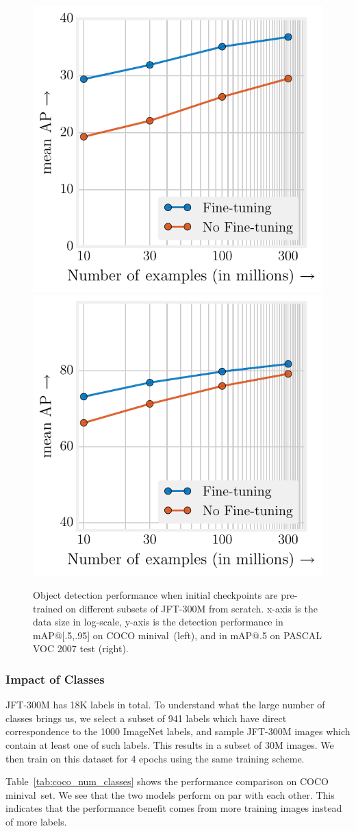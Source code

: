 \documentclass[10pt,twocolumn,letterpaper]{article}
\newcommand{\minival}{minival\raisebox{0.2ex}{$\ast$}}
\begin{document}
\begin{figure}
\centering
\includegraphics[width=0.49\columnwidth]{coco_data_perf}
\includegraphics[width=0.49\columnwidth]{voc_data_perf}\\
\caption{Object detection performance when initial checkpoints are pre-trained on different subsets of JFT-300M from scratch. x-axis is the data size in log-scale, y-axis is the detection performance in mAP@[.5,.95] on COCO \minival\ (left), and in mAP@.5 on PASCAL VOC 2007 test (right).}
\label{fig:coco_data_size}
\end{figure}

\subsubsection*{Impact of Classes}
JFT-300M has 18K labels in total. To understand what the large number of classes brings us, we select a subset of 941 labels which have direct correspondence to the 1000 ImageNet labels, and sample JFT-300M images which contain at least one of such labels. This results in a subset of 30M images. We then train on this dataset for 4 epochs using the same training scheme.

Table~\ref{tab:coco_num_classes} shows the performance comparison on COCO \minival\ set. We see that the two models perform on par with each other. This indicates that the performance benefit comes from more training images instead of more labels.
\end{document}
